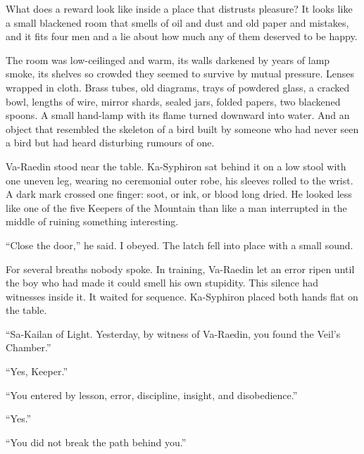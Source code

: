 
\ornament

What does a reward look like inside a place that distrusts pleasure? It looks like a small blackened room that smells of oil and dust and old paper and mistakes, and it fits four men and a lie about how much any of them deserved to be happy.\par

The room was low-ceilinged and warm, its walls darkened by years of lamp smoke, its shelves so crowded they seemed to survive by mutual pressure.
Lenses wrapped in cloth. Brass tubes, old diagrams, trays of powdered glass, a cracked bowl, lengths of wire, mirror shards, sealed jars, folded papers, two blackened spoons.
A small hand-lamp with its flame turned downward into water.
And an object that resembled the skeleton of a bird built by someone who had never seen a bird but had heard disturbing rumours of one.\par

Va-Raedin stood near the table.
Ka-Syphiron sat behind it on a low stool with one uneven leg, wearing no ceremonial outer robe, his sleeves rolled to the wrist.
A dark mark crossed one finger: soot, or ink, or blood long dried.
He looked less like one of the five Keepers of the Mountain than like a man interrupted in the middle of ruining something interesting.\par

``Close the door,'' he said.
I obeyed. The latch fell into place with a small sound.\par

For several breaths nobody spoke.
In training, Va-Raedin let an error ripen until the boy who had made it could smell his own stupidity.
This silence had witnesses inside it.
It waited for sequence.
Ka-Syphiron placed both hands flat on the table.\par


``Sa-Kailan of Light. Yesterday, by witness of Va-Raedin, you found the Veil's Chamber.''\par

``Yes, Keeper.''\par

``You entered by lesson, error, discipline, insight, and disobedience.''\par

``Yes.''\par

``You did not break the path behind you.''\par

